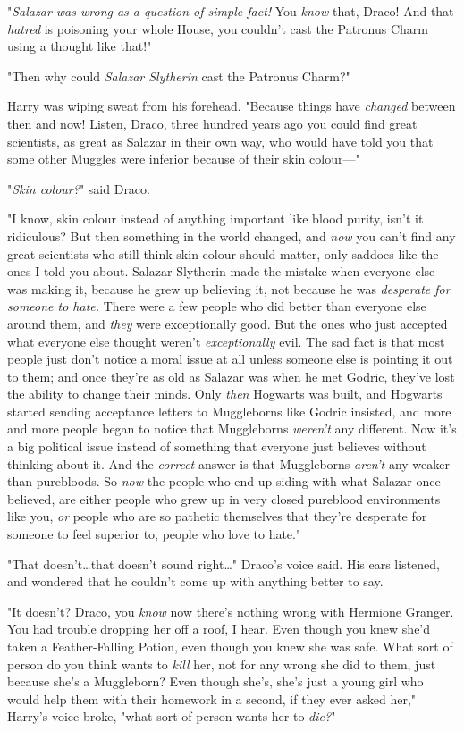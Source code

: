 "\emph{Salazar was wrong as a question of simple fact!} You \emph{know} that,
Draco! And that \emph{hatred} is poisoning your whole House, you couldn’t cast
the Patronus Charm using a thought like that!"

"Then why could \emph{Salazar Slytherin} cast the Patronus Charm?"

Harry was wiping sweat from his forehead. "Because things have \emph{changed}
between then and now! Listen, Draco, three hundred years ago you could find
great scientists, as great as Salazar in their own way, who would have told you
that some other Muggles were inferior because of their skin colour—"

"\emph{Skin colour?}" said Draco.

"I know, skin colour instead of anything important like blood purity, isn’t it
ridiculous? But then something in the world changed, and \emph{now} you can’t
find any great scientists who still think skin colour should matter, only saddoes
like the ones I told you about. Salazar Slytherin made the mistake
when everyone else was making it, because he grew up believing it, not because
he was \emph{desperate for someone to hate.} There were a few people who did
better than everyone else around them, and \emph{they} were exceptionally good.
But the ones who just accepted what everyone else thought weren’t
\emph{exceptionally} evil. The sad fact is that most people just don’t notice a
moral issue at all unless someone else is pointing it out to them; and once
they’re as old as Salazar was when he met Godric, they’ve lost the ability to
change their minds. Only \emph{then} Hogwarts was built, and Hogwarts started
sending acceptance letters to Muggleborns like Godric insisted, and more and
more people began to notice that Muggleborns \emph{weren’t} any different. Now
it’s a big political issue instead of something that everyone just believes
without thinking about it. And the \emph{correct} answer is that Muggleborns
\emph{aren’t} any weaker than purebloods. So \emph{now} the people who end up
siding with what Salazar once believed, are either people who grew up in very
closed pureblood environments like you, \emph{or} people who are so pathetic
themselves that they’re desperate for someone to feel superior to, people who
love to hate."

"That doesn’t…that doesn’t sound right…" Draco’s voice said. His
ears listened, and wondered that he couldn’t come up with anything better to
say.

"It doesn’t? Draco, you \emph{know} now there’s nothing wrong with Hermione
Granger. You had trouble dropping her off a roof, I hear. Even though you knew
she’d taken a Feather-Falling Potion, even though you knew she was safe. What
sort of person do you think wants to \emph{kill} her, not for any wrong she did
to them, just because she’s a Muggleborn? Even though she’s, she’s just a young
girl who would help them with their homework in a second, if they ever asked
her," Harry’s voice broke, "what sort of person wants her to \emph{die?}"

